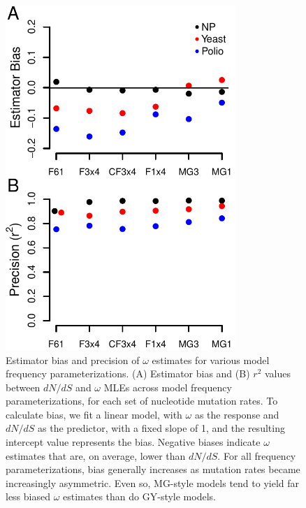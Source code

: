 \documentclass[11pt]{article}
\begin{document}
\begin{figure}[htbp]
	\centerline{\includegraphics[width=8.7cm]{figures/MainText/nyp_bias_r2.pdf}}
	\caption{\label{nyp_bias_r2} Estimator bias and precision of $\omega$ estimates for various model frequency parameterizations. (A) Estimator bias and (B) $r^2$ values between $dN/dS$ and $\omega$ MLEs across model frequency parameterizations, for each set of nucleotide mutation rates. To calculate bias, we fit a linear model, with $\omega$ as the response and $dN/dS$ as the predictor, with a fixed slope of 1, and the resulting intercept value represents the bias. Negative biases indicate $\omega$ estimates that are, on average, lower than $dN/dS$. For all frequency parameterizations, bias generally increases as mutation rates became increasingly asymmetric. Even so, MG-style models tend to yield far less biased $\omega$ estimates than do GY-style models.}	
\end{figure}

\vspace{2cm}
\end{document}
